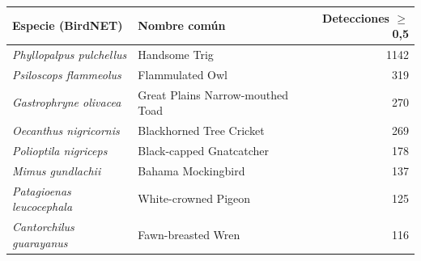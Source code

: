 \begin{tabular}{llr}
\toprule
Especie (BirdNET) & Nombre común & Detecciones $\geq$0,5\\
\midrule
\textit{Phyllopalpus pulchellus} & Handsome Trig & 1142\\
\textit{Psiloscops flammeolus} & Flammulated Owl & 319\\
\textit{Gastrophryne olivacea} & Great Plains Narrow-mouthed Toad & 270\\
\textit{Oecanthus nigricornis} & Blackhorned Tree Cricket & 269\\
\textit{Polioptila nigriceps} & Black-capped Gnatcatcher & 178\\
\textit{Mimus gundlachii} & Bahama Mockingbird & 137\\
\textit{Patagioenas leucocephala} & White-crowned Pigeon & 125\\
\textit{Cantorchilus guarayanus} & Fawn-breasted Wren & 116\\
\bottomrule
\end{tabular}
